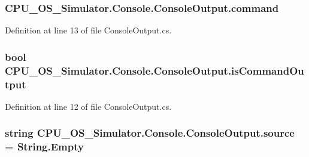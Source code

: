 \subsubsection[{command}]{ C\+P\+U\+\_\+\+O\+S\+\_\+\+Simulator.\+Console.\+Console\+Output.\+command\hspace{0.3cm}{\ttfamily [private]}}\label{class_c_p_u___o_s___simulator_1_1_console_1_1_console_output_aef6097d68fb3e2e83043c3857fdb8d56}


Definition at line 13 of file Console\+Output.\+cs.

\hypertarget{class_c_p_u___o_s___simulator_1_1_console_1_1_console_output_a916cf1368a1974e808ce0f77e850bc98}{}
\subsubsection[{is\+Command\+Output}]{\setlength{\rightskip}{0pt plus 5cm}bool C\+P\+U\+\_\+\+O\+S\+\_\+\+Simulator.\+Console.\+Console\+Output.\+is\+Command\+Output\hspace{0.3cm}{\ttfamily [private]}}\label{class_c_p_u___o_s___simulator_1_1_console_1_1_console_output_a916cf1368a1974e808ce0f77e850bc98}


Definition at line 12 of file Console\+Output.\+cs.

\hypertarget{class_c_p_u___o_s___simulator_1_1_console_1_1_console_output_a3873d00cdb36068d1108fb012857504a}{}
\subsubsection[{source}]{\setlength{\rightskip}{0pt plus 5cm}string C\+P\+U\+\_\+\+O\+S\+\_\+\+Simulator.\+Console.\+Console\+Output.\+source = String.\+Empty\hspace{0.3cm}{\ttfamily [private]}}\label{class_c_p_u___o_s___simulator_1_1_console_1_1_console_output_a3873d00cdb36068d1108fb012857504a}


